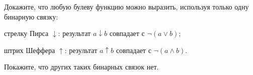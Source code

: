 Докажите, что любую булеву функцию можно выразить, используя только одну бинарную связку:
\begin{enumcyr}
    \item стрелку Пирса $\downarrow$: результат $a \downarrow b$ совпадает с $\lnot (a \lor b)$;
    \item штрих Шеффера $\uparrow$: результат $a \uparrow b$ совпадает с $\lnot (a \land b)$.    
\end{enumcyr}
Покажите, что других таких бинарных связок нет.
